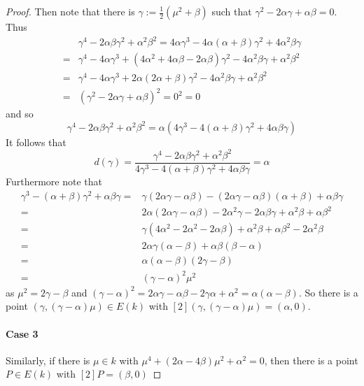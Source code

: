 \documentclass{scrartcl}
\theoremstyle{definition}
\begin{document}
\begin{proof}
    Then note that there is $\gamma := \frac 1 2 (\mu^2 + \beta)$ such that $\gamma^2 - 2\alpha\gamma + \alpha\beta = 0$.
    Thus
    \begin{align*}
        &\gamma^4 - 2 \alpha \beta \gamma^2 + \alpha^2 \beta^2 = 4\alpha \gamma^3 - 4\alpha(\alpha + \beta) \gamma^2 + 4 \alpha^2 \beta \gamma \\
        =& \gamma^4 - 4\alpha \gamma^3 + (4\alpha^2 + 4\alpha\beta - 2\alpha\beta)\gamma^2 - 4\alpha^2\beta \gamma + \alpha^2\beta^2 \\
        =& \gamma^4 - 4\alpha \gamma^3 + 2\alpha(2\alpha + \beta)\gamma^2 - 4\alpha^2\beta \gamma + \alpha^2\beta^2 \\
        =& (\gamma^2 - 2\alpha \gamma + \alpha \beta)^2 = 0^2 = 0
    \end{align*}
    and so
    \begin{equation*}
        \gamma^4 - 2 \alpha \beta \gamma^2 + \alpha^2 \beta^2 = \alpha(4\gamma^3 - 4(\alpha + \beta) \gamma^2 + 4 \alpha \beta \gamma)
    \end{equation*}
    It follows that
    \begin{equation*}
        d(\gamma) = \frac {\gamma^4 - 2 \alpha \beta \gamma^2 + \alpha^2 \beta^2} {4\gamma^3 - 4(\alpha + \beta) \gamma^2 + 4 \alpha \beta \gamma} = \alpha
    \end{equation*}
    Furthermore note that
    \begin{align*}
        \gamma^3 - (\alpha + \beta)\gamma^2 + \alpha\beta\gamma =& \gamma(2\alpha\gamma - \alpha\beta) - (2\alpha\gamma - \alpha\beta)(\alpha + \beta) + \alpha\beta\gamma \\
        =& 2\alpha(2\alpha\gamma - \alpha\beta) - 2\alpha^2\gamma - 2\alpha\beta\gamma + \alpha^2\beta + \alpha\beta^2 \\
        =& \gamma(4\alpha^2 - 2\alpha^2 - 2\alpha\beta) + \alpha^2\beta + \alpha\beta^2 - 2\alpha^2\beta \\
        =& 2\alpha\gamma(\alpha - \beta) + \alpha\beta(\beta - \alpha) \\
        =& \alpha(\alpha - \beta)(2\gamma - \beta) \\
        =& (\gamma - \alpha)^2\mu^2
    \end{align*}
    as $\mu^2 = 2\gamma - \beta$ and $(\gamma - \alpha)^2 = 2\alpha\gamma - \alpha\beta - 2\gamma\alpha + \alpha^2 = \alpha(\alpha - \beta)$.
    So there is a point $(\gamma, (\gamma - \alpha)\mu) \in E(k)$ with $[2](\gamma, (\gamma - \alpha)\mu) = (\alpha, 0)$.

    \paragraph{Case 3} Similarly, if there is $\mu \in k$ with $\mu^4 + (2\alpha - 4\beta)\mu^2 + \alpha^2 = 0$, then there is a point $P \in E(k)$ with $[2]P = (\beta, 0)$
\end{proof}
\end{document}
